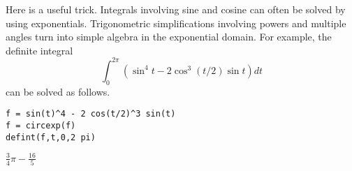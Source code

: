 
\bigskip
\noindent
Here is a useful trick.
Integrals involving sine and cosine
can often be solved by using exponentials.
Trigonometric simplifications involving powers
and multiple angles turn into simple algebra in the
exponential domain.
For example, the definite integral
$$\int_0^{2\pi}\left(\sin^4t-2\cos^3(t/2)\sin t\right)dt$$
can be solved as follows.

{\color{blue}
\begin{verbatim}
f = sin(t)^4 - 2 cos(t/2)^3 sin(t)
f = circexp(f)
defint(f,t,0,2 pi)
\end{verbatim}
}

\noindent
$\displaystyle \tfrac{3}{4}\pi-\tfrac{16}{5}$
